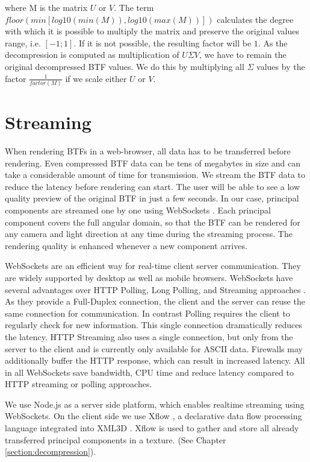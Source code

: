  where M is the matrix $U$ or $V$. The term $floor(min[log10(min(M)),log10(max(M))])$ calculates the degree with which it is possible to multiply the matrix and preserve the original values range, i.e. $[-1;1]$.
 If it is not possible, the resulting factor will be $1$.
As the decompression is computed as multiplication of $U\Sigma V$, we have to remain the original decompressed BTF values.
We do this by  multiplying all $\Sigma$ values by the factor $\tfrac{1}{factor(M)}$ if we scale either $U$ or $V$.


 
\section{Streaming}
\label{section:impl_streaming}

When rendering BTFs in a web-browser, all data has to be transferred before rendering.
Even compressed BTF data can be tens of megabytes in size and can take a considerable amount of time for transmission.
We stream the BTF data to reduce the latency before rendering can start.
 The user will be able to see a low quality preview of the original BTF in just a few seconds. 
In our case, principal components are streamed one by one using WebSockets \cite{WebSockets}.
Each principal component covers the full angular domain, so that the BTF can be rendered for any camera and light direction at any time during the streaming process.
The rendering quality is enhanced whenever a new component arrives.


 WebSockets are an efficient way for real-time client server communication.
 They are widely supported by desktop as well as mobile browsers.
WebSockets have several advantages over HTTP Polling, Long Polling, and Streaming approaches \cite[Ch.\ 1]{WebSockets}.  
As they provide a Full-Duplex connection, the client and the server can reuse the same connection for communication.
In contrast Polling requires the client to regularly check for new information.
 This single connection dramatically reduces the latency.
HTTP Streaming also uses a single connection, but only from the server to the client and is currently only available for ASCII data. 
Firewalls may additionally buffer the HTTP response, which can result in increased latency.
All in all WebSockets save bandwidth, CPU time and reduce  latency compared to HTTP streaming or polling approaches.

We use Node.js \cite{nodejs} as a server side platform, which enables realtime streaming using WebSockets. 
On the client side we use Xflow \cite{xflow}, a declarative data flow processing language integrated into XML3D \cite{xml3d}.
 Xflow is used to gather and store all already transferred principal components in a texture. (See Chapter  \ref{section:decompression}).





